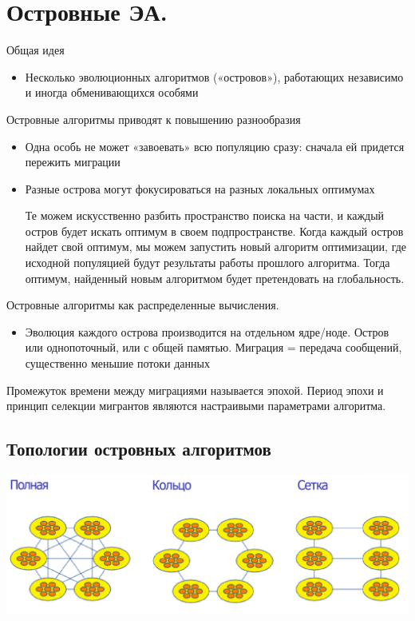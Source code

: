 \section{Островные ЭА.}
Общая идея
\begin{itemize}
    \item Несколько эволюционных алгоритмов («островов»), работающих независимо и иногда обменивающихся особями
\end{itemize}  
Островные алгоритмы приводят к повышению разнообразия
\begin{itemize}
    \item Одна особь не может «завоевать» всю популяцию сразу: сначала ей придется пережить миграции
    \item Разные острова могут фокусироваться на разных локальных оптимумах 
 
        Те можем искусственно разбить пространство поиска на части, и каждый остров будет искать оптимум в своем подпространстве. Когда каждый остров найдет свой оптимум, мы можем запустить новый алгоритм оптимизации, где исходной популяцией будут результаты работы прошлого алгоритма. Тогда оптимум, найденный новым алгоритмом будет претендовать на глобальность.
\end{itemize} 
Островные алгоритмы как распределенные вычисления.
\begin{itemize}
    \item Эволюция каждого острова производится на отдельном ядре/ноде. Остров или однопоточный, или с общей памятью. Миграция = передача сообщений, существенно меньшие потоки данных
\end{itemize}


Промежуток времени между миграциями называется эпохой. Период эпохи и принцип селекции мигрантов являются настраивыми параметрами алгоритма.

\subsection*{Топологии островных алгоритмов}

\includegraphics[width=14cm]{images/67_topology.png} 


